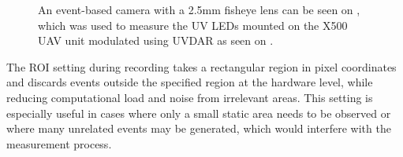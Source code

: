 \begin{figure}[H]
	\centering
	\caption{
  An event-based camera with a 2.5mm fisheye lens can be seen on , which was used to measure the UV LEDs mounted on the X500 UAV unit modulated using UVDAR as seen on .
  }
	\label{fig:uavcam}
\end{figure}

The \ac{ROI} setting during recording takes a rectangular region in pixel coordinates and discards events outside the specified region at the hardware level, while reducing computational load and noise from irrelevant areas. This setting is especially useful in cases where only a small static area needs to be observed or where many unrelated events
may be generated, which would interfere with the measurement process.

